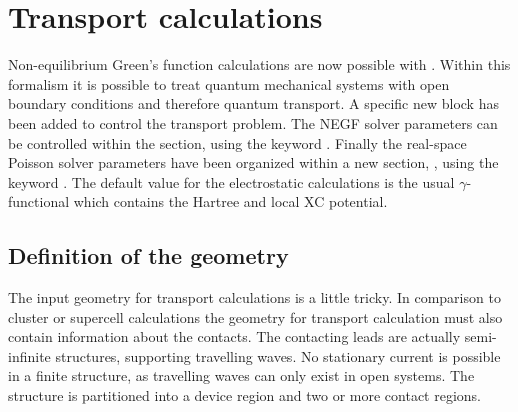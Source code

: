 
\chapter{Transport calculations}
\label{app:transp}

Non-equilibrium Green's function calculations are now possible with
{\dftbp}. Within this formalism it is possible to treat quantum mechanical
systems with open boundary conditions and therefore quantum transport.  A
specific new  block has been added to control the transport
problem.  The NEGF solver parameters can be controlled within the
 section, using the keyword . Finally the
real-space Poisson solver parameters have been organized within a new section,
, using the keyword . The default value for the
electrostatic calculations is the usual $\gamma$-functional which contains the
Hartree and local XC potential.

\section{Definition of the geometry}

The input geometry for transport calculations is a little tricky. In comparison
to cluster or supercell calculations the geometry for transport calculation must
also contain information about the contacts. The contacting leads are actually
semi-infinite structures, supporting travelling waves. No stationary current is
possible in a finite structure, as travelling waves can only exist in open
systems.  The structure is partitioned into a device region and two or more
contact regions.

